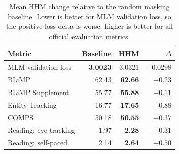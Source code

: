 \begin{table}[t]
\centering
\fontsize{8.4}{9.0}\selectfont
\setlength{\tabcolsep}{3.0pt}
\renewcommand{\arraystretch}{1.0}
\begin{tabular}{@{}l r r r@{}}
\toprule
\textbf{Metric} & \textbf{Baseline} & \textbf{HHM} & \textbf{$\Delta$} \\
\midrule
MLM validation loss & \textbf{3.0023} & 3.0321 & $+0.0298$ \\
\rowcolor{tablegray}
BLiMP & 62.43 & \textbf{62.66} & \textbf{$+0.23$} \\
BLiMP Supplement & 55.77 & \textbf{55.88} & \textbf{$+0.11$} \\
\rowcolor{tablegray}
Entity Tracking & 16.77 & \textbf{17.65} & \textbf{$+0.88$} \\
COMPS & 50.18 & \textbf{50.55} & \textbf{$+0.37$} \\
\rowcolor{tablegray}
Reading: eye tracking & 1.97 & \textbf{2.28} & \textbf{$+0.31$} \\
Reading: self-paced & 2.14 & \textbf{2.64} & \textbf{$+0.50$} \\
\bottomrule
\end{tabular}
\caption{Mean HHM change relative to the random masking baseline. Lower is better for MLM validation loss, so the positive loss delta is worse; higher is better for all official evaluation metrics.}
\label{tab:improvement-summary}
\end{table}
